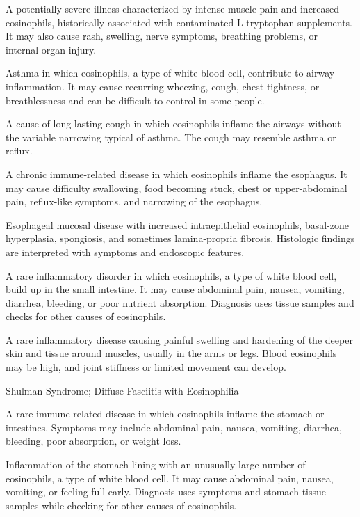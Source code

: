  A potentially severe illness characterized by intense muscle pain and increased eosinophils, historically associated with contaminated L-tryptophan supplements. It may also cause rash, swelling, nerve symptoms, breathing problems, or internal-organ injury.

 Asthma in which eosinophils, a type of white blood cell, contribute to airway inflammation. It may cause recurring wheezing, cough, chest tightness, or breathlessness and can be difficult to control in some people.

 A cause of long-lasting cough in which eosinophils inflame the airways without the variable narrowing typical of asthma. The cough may resemble asthma or reflux.

 A chronic immune-related disease in which eosinophils inflame the esophagus. It may cause difficulty swallowing, food becoming stuck, chest or upper-abdominal pain, reflux-like symptoms, and narrowing of the esophagus.

 Esophageal mucosal disease with increased intraepithelial eosinophils, basal-zone hyperplasia, spongiosis, and sometimes lamina-propria fibrosis. Histologic findings are interpreted with symptoms and endoscopic features.

 A rare inflammatory disorder in which
  eosinophils, a type of white blood cell, build up in the small
  intestine. It may cause abdominal pain, nausea, vomiting, diarrhea,
  bleeding, or poor nutrient absorption. Diagnosis uses tissue samples
  and checks for other causes of eosinophils.

 A rare inflammatory disease causing painful swelling and hardening of the deeper skin and tissue around muscles, usually in the arms or legs. Blood eosinophils may be high, and joint stiffness or limited movement can develop.

\synonyms
Shulman Syndrome; Diffuse Fasciitis with Eosinophilia

 A rare immune-related disease in which eosinophils inflame the stomach or intestines. Symptoms may include abdominal pain, nausea, vomiting, diarrhea, bleeding, poor absorption, or weight loss.

 Inflammation of the stomach lining with an unusually large number of eosinophils, a type of white blood cell. It may cause abdominal pain, nausea, vomiting, or feeling full early. Diagnosis uses symptoms and stomach tissue samples while checking for other causes of eosinophils.

